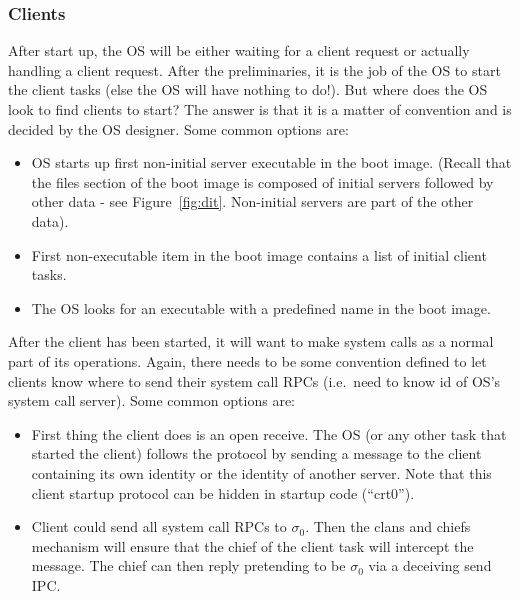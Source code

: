 
\subsubsection{Clients}


After start up, the OS will be either waiting for a client request or
actually handling a client request. After the preliminaries, it is the
job of the OS to start the client tasks (else the OS will have nothing
to do!). But where does the OS look to find clients to start? The
answer is that it is a matter of convention and is decided by the OS
designer. Some common options are:

\begin{itemize}

\item OS starts up first non-initial server executable in the boot
  image. (Recall that the files section of the boot image is composed
  of initial servers followed by other data - see
  Figure~\ref{fig:dit}.  Non-initial servers are part of the other
  data).

\item First non-executable item in the boot image contains a list of
  initial client tasks.

\item The OS looks for an executable with a predefined name in the
  boot image.

\end{itemize}

After the client has been started, it will want to make system calls
as a normal part of its operations. Again, there needs to be some
convention defined to let clients know where to send their system call
RPCs (i.e.\ need to know id of OS's system call server). Some common
options are:

\begin{itemize}

\item First thing the client does is an open receive. The OS (or any
  other task that started the client) follows the protocol by sending
  a message to the client containing its own identity or the identity
  of another server. Note that this client startup protocol can be
  hidden in startup code (``crt0'').

\item Client could send all system call RPCs to $\sigma_0$. Then the
  clans and chiefs mechanism will ensure that the chief of the client
  task will intercept the message. The chief can then reply pretending
  to be $\sigma_0$ via a deceiving send IPC.\\ 

\end{itemize}

